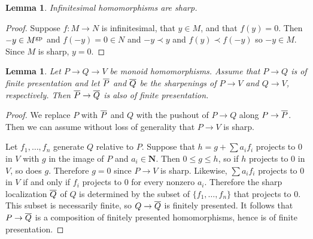 \documentclass[10pt]{article}
\numberwithin{equation}{section}
\newtheorem{lemma}[paragraph]{Lemma}
\theoremstyle{definition}
\theoremstyle{remark}
\newcommand{\gp}[1]{#1^{\rm gp}}
\renewcommand{\bar}[1]{\overnorm{#1}\vphantom{#1}}
\def\overnorm#1{\overline{#1}\vphantom{#1}}
\begin{document}
\begin{lemma} \label{lem:13}
	Infinitesimal homomorphisms are sharp.
\end{lemma}
\begin{proof}
	Suppose $f : M \to N$ is infinitesimal, that $y \in M$, and that $f(y) = 0$.  Then $-y \in \gp M$ and $f(-y) = 0 \in N$ and $-y \prec y$ and $f(y) \prec f(-y)$ so $-y \in M$.  Since $M$ is sharp, $y = 0$.
\end{proof}





\begin{lemma} \label{lem:11}
	Let $P \to Q \to V$ be monoid homomorphisms.  Assume that $P \to Q$ is of finite presentation and let $\bar P$ and $\bar Q$ be the sharpenings of $P \to V$ and $Q \to V$, respectively.  Then $\bar P \to \bar Q$ is also of finite presentation.
\end{lemma}
\begin{proof}
	We replace $P$ with $\bar P$ and $Q$ with the pushout of $P \to Q$ along $P \to \bar P$.  Then we can assume without loss of generality that $P \to V$ is sharp.

	Let $f_1, \ldots, f_n$ generate $Q$ relative to $P$.  Suppose that $h = g + \sum a_i f_i$ projects to $0$ in $V$ with $g$ in the image of $P$ and $a_i \in \mathbf N$.  Then $0 \leq g \leq h$, so if $h$ projects to $0$ in $V$, so does $g$.  Therefore $g = 0$ since $P \to V$ is sharp.  Likewise, $\sum a_i f_i$ projects to $0$ in $V$ if and only if $f_i$ projects to $0$ for every nonzero $a_i$.  Therefore the sharp localization $\bar Q$ of $Q$ is determined by the subset of $\{ f_1, \ldots, f_n \}$ that projects to $0$.  This subset is necessarily finite, so $Q \to \bar Q$ is finitely presented.  It follows that $P \to \bar Q$ is a composition of finitely presented homomorphisms, hence is of finite presentation.
\end{proof}
\end{document}
